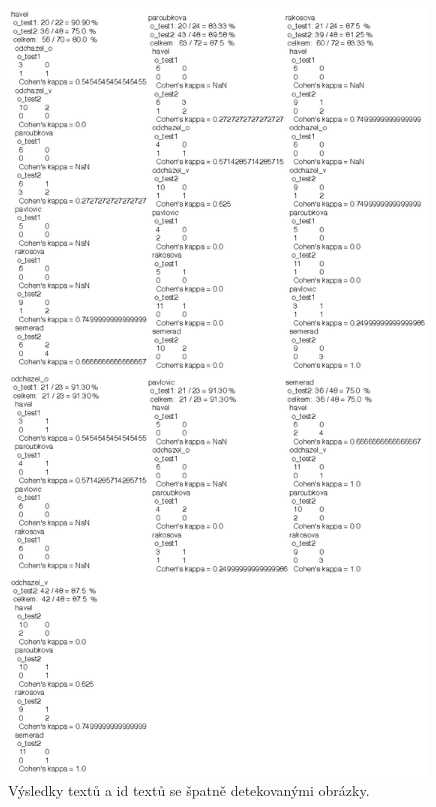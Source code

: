 \begin{figure}[h]
  \centering
  \includegraphics[height=8in]{priloha_1_2.eps}
  \caption{Výsledky textů a id textů se špatně detekovanými obrázky.}
  \label{fig:priloha_1_2}
\end{figure}

%